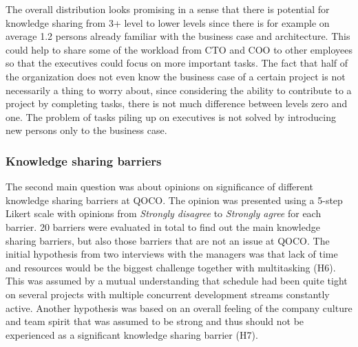 The overall distribution looks promising in a sense that there is potential for knowledge sharing from 3+ level to lower levels since there is for example
on average 1.2 persons already familiar with the business case and architecture. This could help to share some of the workload from CTO and COO to other employees so that
the executives could focus on more important tasks. The fact that half of the organization does not even know the business case of a certain project is not
necessarily a thing to worry about, since considering the ability to contribute to a project by completing tasks, there is not much difference between levels zero and one.
The problem of tasks piling up on executives is not solved by introducing new persons only to the business case.

\subsubsection*{Knowledge sharing barriers}

The second main question was about opinions on significance of different knowledge sharing barriers at QOCO. The opinion was presented using a 5-step Likert scale \citep{Boone2012} with
opinions from \emph{Strongly disagree} to \emph{Strongly agree} for each barrier. 20 barriers were evaluated in total to find out the main knowledge sharing barriers, but also
those barriers that are not an issue at QOCO. The initial hypothesis from two interviews with the managers was that lack of time and resources would be
the biggest challenge together with multitasking (H6). This was assumed by a mutual understanding that schedule had been quite tight on several projects with multiple
concurrent development streams constantly active. Another hypothesis was based on an overall feeling of the company culture and team spirit that was assumed to be strong
and thus should not be experienced as a significant knowledge sharing barrier (H7).

